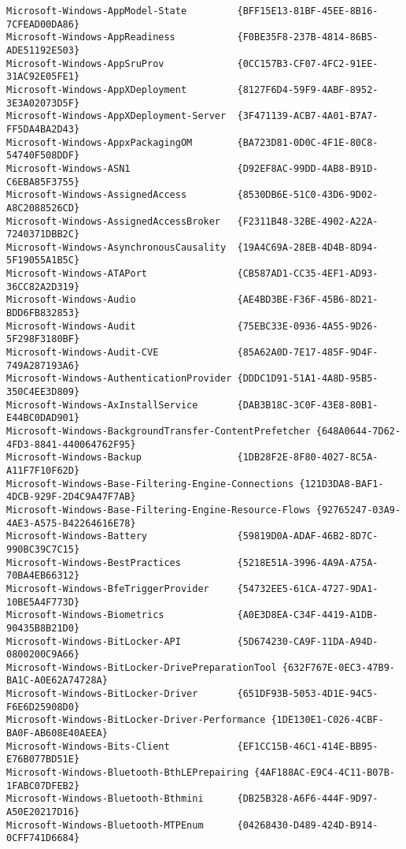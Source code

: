 \documentclass{report}
\begin{document}
\begin{lstlisting}[breaklines=true,basicstyle=\tiny]
Microsoft-Windows-AppModel-State         {BFF15E13-81BF-45EE-8B16-7CFEAD00DA86}
Microsoft-Windows-AppReadiness           {F0BE35F8-237B-4814-86B5-ADE51192E503}
Microsoft-Windows-AppSruProv             {0CC157B3-CF07-4FC2-91EE-31AC92E05FE1}
Microsoft-Windows-AppXDeployment         {8127F6D4-59F9-4ABF-8952-3E3A02073D5F}
Microsoft-Windows-AppXDeployment-Server  {3F471139-ACB7-4A01-B7A7-FF5DA4BA2D43}
Microsoft-Windows-AppxPackagingOM        {BA723D81-0D0C-4F1E-80C8-54740F508DDF}
Microsoft-Windows-ASN1                   {D92EF8AC-99DD-4AB8-B91D-C6EBA85F3755}
Microsoft-Windows-AssignedAccess         {8530DB6E-51C0-43D6-9D02-A8C2088526CD}
Microsoft-Windows-AssignedAccessBroker   {F2311B48-32BE-4902-A22A-7240371DBB2C}
Microsoft-Windows-AsynchronousCausality  {19A4C69A-28EB-4D4B-8D94-5F19055A1B5C}
Microsoft-Windows-ATAPort                {CB587AD1-CC35-4EF1-AD93-36CC82A2D319}
Microsoft-Windows-Audio                  {AE4BD3BE-F36F-45B6-8D21-BDD6FB832853}
Microsoft-Windows-Audit                  {75EBC33E-0936-4A55-9D26-5F298F3180BF}
Microsoft-Windows-Audit-CVE              {85A62A0D-7E17-485F-9D4F-749A287193A6}
Microsoft-Windows-AuthenticationProvider {DDDC1D91-51A1-4A8D-95B5-350C4EE3D809}
Microsoft-Windows-AxInstallService       {DAB3B18C-3C0F-43E8-80B1-E44BC0DAD901}
Microsoft-Windows-BackgroundTransfer-ContentPrefetcher {648A0644-7D62-4FD3-8841-440064762F95}
Microsoft-Windows-Backup                 {1DB28F2E-8F80-4027-8C5A-A11F7F10F62D}
Microsoft-Windows-Base-Filtering-Engine-Connections {121D3DA8-BAF1-4DCB-929F-2D4C9A47F7AB}
Microsoft-Windows-Base-Filtering-Engine-Resource-Flows {92765247-03A9-4AE3-A575-B42264616E78}
Microsoft-Windows-Battery                {59819D0A-ADAF-46B2-8D7C-990BC39C7C15}
Microsoft-Windows-BestPractices          {5218E51A-3996-4A9A-A75A-70BA4EB66312}
Microsoft-Windows-BfeTriggerProvider     {54732EE5-61CA-4727-9DA1-10BE5A4F773D}
Microsoft-Windows-Biometrics             {A0E3D8EA-C34F-4419-A1DB-90435B8B21D0}
Microsoft-Windows-BitLocker-API          {5D674230-CA9F-11DA-A94D-0800200C9A66}
Microsoft-Windows-BitLocker-DrivePreparationTool {632F767E-0EC3-47B9-BA1C-A0E62A74728A}
Microsoft-Windows-BitLocker-Driver       {651DF93B-5053-4D1E-94C5-F6E6D25908D0}
Microsoft-Windows-BitLocker-Driver-Performance {1DE130E1-C026-4CBF-BA0F-AB608E40AEEA}
Microsoft-Windows-Bits-Client            {EF1CC15B-46C1-414E-BB95-E76B077BD51E}
Microsoft-Windows-Bluetooth-BthLEPrepairing {4AF188AC-E9C4-4C11-B07B-1FABC07DFEB2}
Microsoft-Windows-Bluetooth-Bthmini      {DB25B328-A6F6-444F-9D97-A50E20217D16}
Microsoft-Windows-Bluetooth-MTPEnum      {04268430-D489-424D-B914-0CFF741D6684}

\end{lstlisting}
\end{document}
